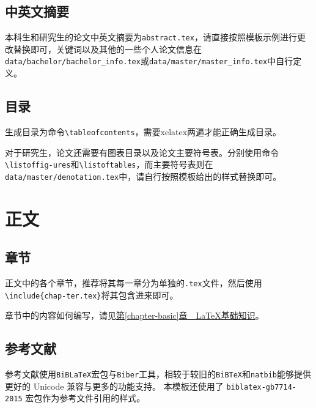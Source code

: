\subsection{中英文摘要}
本科生和研究生的论文中英文摘要为\texttt{abstract.tex}，请直接按照模板示例进行更改替换即可，关键词以及其他的一些个人论文信息在\texttt{data/bachelor/bachelor\_info.tex}或\texttt{data/master/master\_info.tex}中自行定义。

\subsection{目录}
生成目录为命令\texttt{\textbackslash tableofcontents}，需要xelatex两遍才能正确生成目录。

对于研究生，论文还需要有图表目录以及论文主要符号表。分别使用命令\texttt{\textbackslash listoffig\hyp{}ures}和\texttt{\textbackslash listoftables}，而主要符号表则在\texttt{data/master/denotation.tex}中，请自行按照模板给出的样式替换即可。

\section{正文}
\subsection{章节}
正文中的各个章节，推荐将其每一章分为单独的\texttt{.tex}文件，然后使用\texttt{\textbackslash include\{chap\hyp{}ter.tex\}}将其包含进来即可。

章节中的内容如何编写，请见\hyperref[chapter-basic]{第\ref{chapter-basic}章~~\LaTeX{}基础知识}。

\subsection{参考文献}
参考文献使用\verb|BiBLaTeX|宏包与\verb|Biber|工具，相较于较旧的\verb|BiBTeX|和\verb|natbib|能够提供更好的 Unicode 兼容与更多的功能支持。
本模板还使用了 \verb|biblatex-gb7714-2015| 宏包作为参考文件引用的样式。

